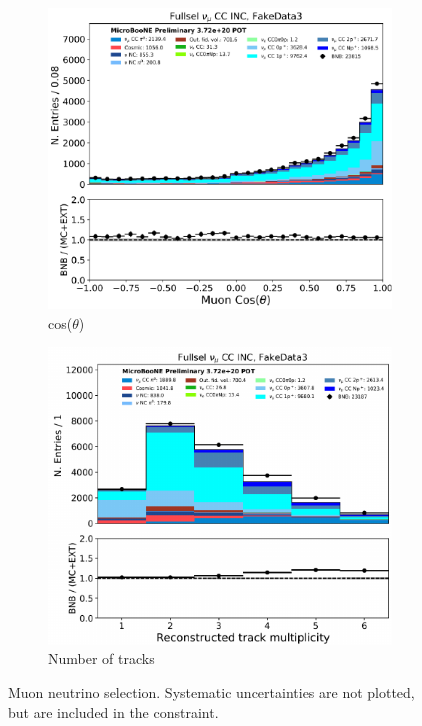 \begin{figure}[H]
\begin{center}
\begin{subfigure}[b]{0.3\textwidth}
    \includegraphics[width=1.00\textwidth]{Fakedata/set3/numu_costheta.pdf}
    \caption{\label{fig:fakedata:set3:numu_costheta} cos($\theta$)}
    \end{subfigure}
    \begin{subfigure}[b]{0.3\textwidth}
    \centering
    \includegraphics[width=1.00\textwidth]{Fakedata/set3/numu_ntracks.pdf}
    \caption{\label{fig:fakedata:set3:numu_ntracks} Number of tracks}
    \end{subfigure}
\caption{\label{fig:fakedata:set3:numu} Muon neutrino selection. Systematic uncertainties are not plotted, but are included in the constraint.}
\end{center}
\end{figure}

